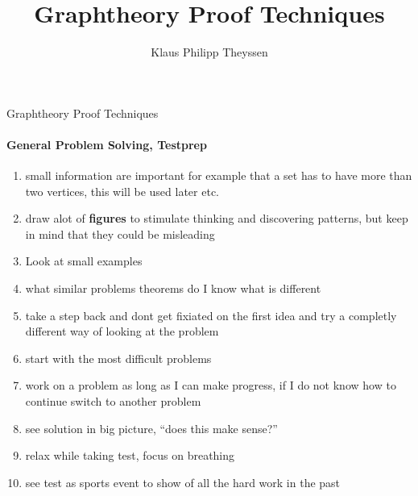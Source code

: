 \documentclass[a4paper]{article}
\title{Graphtheory Proof Techniques}
\author{Klaus Philipp Theyssen}
\begin{document}
\begin{center}
    \Large Graphtheory Proof Techniques
\end{center}


\paragraph{General Problem Solving, Testprep}
\begin{enumerate}
    \item small information are important for example that a set 
    has to have more than two vertices, this will be used later etc.
    \item draw alot of \textbf{figures} to stimulate thinking and discovering patterns,
    but keep in mind that they could be misleading
    \item Look at small examples 
    \item what similar problems theorems do I know what is different
    \item take a step back and dont get fixiated on the first idea and try 
    a completly different way of looking at the problem
    \item start with the most difficult problems
    \item work on a problem as long as I can make progress, if I do not know
    how to continue switch to another problem
    \item see solution in big picture, \enquote{does this make sense?}
    \item relax while taking test, focus on breathing 
    \item see test as sports event to show of all the hard work in the past
\end{enumerate}
\end{document}
